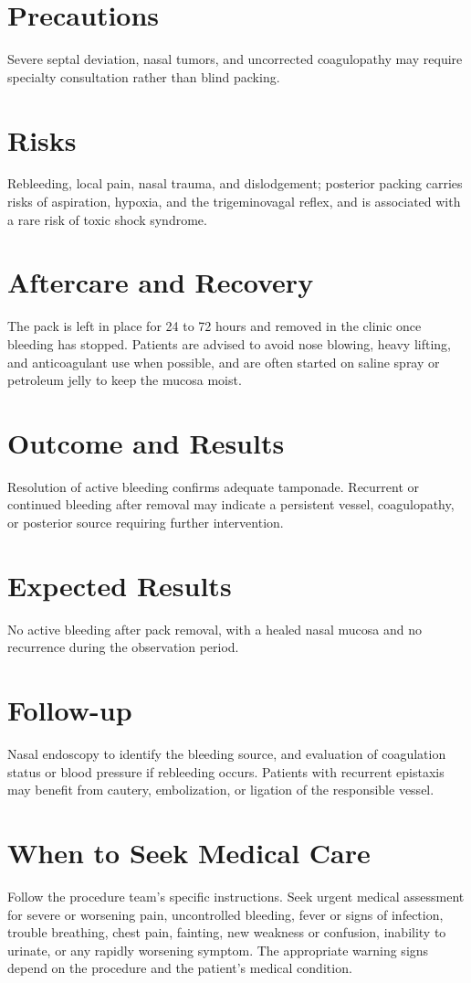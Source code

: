 \section*{Precautions}
Severe septal deviation, nasal tumors, and uncorrected coagulopathy may require specialty consultation rather than blind packing.

\section*{Risks}
Rebleeding, local pain, nasal trauma, and dislodgement; posterior packing carries risks of aspiration, hypoxia, and the trigeminovagal reflex, and is associated with a rare risk of toxic shock syndrome.

\section*{Aftercare and Recovery}
The pack is left in place for 24 to 72 hours and removed in the clinic once bleeding has stopped. Patients are advised to avoid nose blowing, heavy lifting, and anticoagulant use when possible, and are often started on saline spray or petroleum jelly to keep the mucosa moist.

\section*{Outcome and Results}
Resolution of active bleeding confirms adequate tamponade. Recurrent or continued bleeding after removal may indicate a persistent vessel, coagulopathy, or posterior source requiring further intervention.

\section*{Expected Results}
No active bleeding after pack removal, with a healed nasal mucosa and no recurrence during the observation period.

\section*{Follow-up}
Nasal endoscopy to identify the bleeding source, and evaluation of coagulation status or blood pressure if rebleeding occurs. Patients with recurrent epistaxis may benefit from cautery, embolization, or ligation of the responsible vessel.

\section*{When to Seek Medical Care}
Follow the procedure team's specific instructions. Seek urgent medical assessment for severe or worsening pain, uncontrolled bleeding, fever or signs of infection, trouble breathing, chest pain, fainting, new weakness or confusion, inability to urinate, or any rapidly worsening symptom. The appropriate warning signs depend on the procedure and the patient's medical condition.

